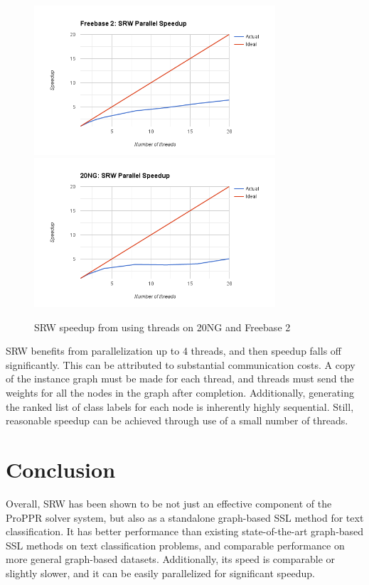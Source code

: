 \documentclass[12pt]{article}
\begin{document}
\begin{figure}[H]
    \centering
    \includegraphics[width=0.8\textwidth]{figures/freebase2-speedup}
    \includegraphics[width=0.8\textwidth]{figures/20NG-speedup}
    \caption{SRW speedup from using threads on 20NG and Freebase 2\label{fig:speedup}}
\end{figure}
SRW benefits from parallelization up to 4 threads, and then speedup falls off significantly.
This can be attributed to substantial communication costs.
A copy of the instance graph must be made for each thread, and threads must send the weights for all the nodes in the graph after completion.
Additionally, generating the ranked list of class labels for each node is inherently highly sequential.
Still, reasonable speedup can be achieved through use of a small number of threads.

\section{Conclusion}
Overall, SRW has been shown to be not just an effective component of the ProPPR solver system, but also as a standalone graph-based SSL method for text classification.
It has better performance than existing state-of-the-art graph-based SSL methods on text classification problems, and comparable performance on more general graph-based datasets.
Additionally, its speed is comparable or slightly slower, and it can be easily parallelized for significant speedup.
\end{document}
